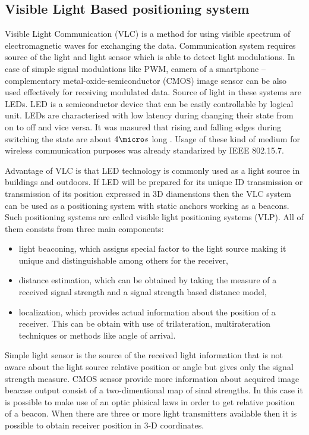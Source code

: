 \documentclass[../main.tex]{subfiles}
\begin{document}


\subsection{Visible Light Based positioning system} %
\label{sub:visible_light_based_positioning_system}


Visible Light Communication (VLC) is a method for using visible spectrum of electromagnetic waves for exchanging the data. Communication system requires source of the light and light sensor which is able to detect light modulations. In case of simple signal modulations like PWM, camera of a smartphone -- complementary
metal-oxide-semiconductor (CMOS) image sensor can be also used effectively for receiving modulated data. Source of light in these systems are LEDs. LED is a semiconductor device that can be easily controllable by logical unit. LEDs are characterised with low latency during changing their state from on to off and vice versa. It was masured that rising and falling edges during switching the state are about $4 \micro s$ long \cite{visible_light_positioning_epsilon}. Usage of these kind of medium for wireless communication purposes was already standarized by IEEE 802.15.7.

Advantage of VLC is that LED technology is commonly used as a light source in buildings and outdoors. If LED will be prepared for its unique ID transmission or transmission of its position expressed in 3D diamensions then the VLC system can be used as a positioning system with static anchors working as a beacons. Such positioning systems are called visible light positioning systems (VLP). All of them consists from three main components:
\begin{itemize}
	\item light beaconing, which assigns special factor to the light source making it unique and distinguishable among others for the receiver,
	\item distance estimation, which can be obtained by taking the measure of a received signal strength and a signal strength based distance model,
	\item localization, which provides actual information about the position of a receiver. This can be obtain with use of trilateration, multirateration techniques or methods like angle of arrival.
\end{itemize}

Simple light sensor is the source of the received light information that is not aware about the light source relative position or angle but gives only the signal strength measure. CMOS sensor provide more information about acquired image beacase output consist of a two-dimentional map of sinal strengths. In this case it is possible to make use of an optic phisical laws in order to get relative position of a beacon. When there are three or more light transmitters available then it is possible to obtain receiver position in 3-D coordinates.
\end{document}
